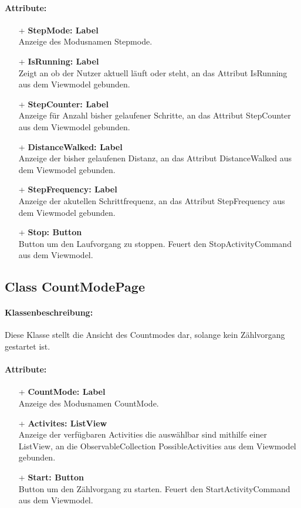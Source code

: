 \documentclass[a4paper,12pt]{article}
\begin{document}
\paragraph{Attribute:}
	\begin{itemize}
	\item[+] \textbf{StepMode: Label} \\ Anzeige des Modusnamen Stepmode.
	\item[+] \textbf{IsRunning: Label} \\ Zeigt an ob der Nutzer aktuell läuft oder steht, an das Attribut IsRunning aus dem Viewmodel gebunden.
	\item[+] \textbf{StepCounter: Label} \\ Anzeige für Anzahl bisher gelaufener Schritte, an das Attribut StepCounter aus dem Viewmodel gebunden.
	\item[+] \textbf{DistanceWalked: Label} \\ Anzeige der bisher gelaufenen Distanz, an das Attribut DistanceWalked aus dem Viewmodel gebunden.
	\item[+] \textbf{StepFrequency: Label} \\ Anzeige der akutellen Schrittfrequenz, an das Attribut StepFrequency aus dem Viewmodel gebunden.
	\item[+] \textbf{Stop: Button} \\ Button um den Laufvorgang zu stoppen. Feuert den StopActivityCommand aus dem Viewmodel.
	\end{itemize}
	
\subsection{Class CountModePage}
\paragraph{Klassenbeschreibung:}
Diese Klasse stellt die Ansicht des Countmodes dar, solange kein Zählvorgang gestartet ist.
\paragraph{Attribute:}
	\begin{itemize}
	\item[+] \textbf{CountMode: Label} \\ Anzeige des Modusnamen CountMode.
	\item[+] \textbf{Activites: ListView} \\ Anzeige der verfügbaren Activities die auswählbar sind mithilfe einer ListView, an die ObservableCollection PossibleActivities aus dem Viewmodel gebunden.
	\item[+] \textbf{Start: Button} \\ Button um den Zählvorgang zu starten. Feuert den StartActivityCommand aus dem Viewmodel.
	\end{itemize}
\end{document}
